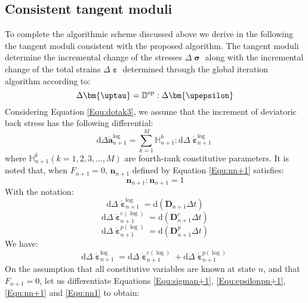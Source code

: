 \subsection{Consistent tangent moduli}
\noindent
To complete the algorithmic scheme discussed above we derive in the following the tangent moduli consistent with the proposed algorithm. The tangent moduli determine the incremental change of the stresses $\Delta {\bm{\upsigma }}$ along with the incremental change of the total strains $\Delta {\bm{\upepsilon }}$ determined through the global iteration algorithm according to:
\begin{equation}
\Delta {\bm{\uptau }} = {\mathbb{D}^{\rm{ep}}}:\Delta {\bm{\upepsilon }}
\end{equation}
Considering Equation \ref{Equ:dotak3}, we assume that the increment of deviatoric back stress has the following differential:
\begin{equation}
\label{Equ:dan+1}
{\text{d}}\Delta \mathring {\mathbf{a}}_{n + 1}^{\log } = \sum\limits_{k = 1}^M {\mathbb{H}_{n + 1}^k} :{\text{d}}\Delta \mathring {\bm{\upepsilon}}_{n + 1}^{\log }
\end{equation}
where $\mathbb{H}_{n + 1}^k( k = 1,2,3,...,M )$ are fourth-rank constitutive parameters.
It is noted that, when ${F_{n + 1}} = 0$, ${\mathbf{n}}_{n + 1}$ defined by Equation \ref{Equ:nn+1} satisfies:
\begin{equation}
\label{Equ:nn1}
{{\mathbf{n}}_{n + 1}}:{{\mathbf{n}}_{n + 1}} = 1
\end{equation}
With the notation:
\begin{equation}
{\text{d}}\Delta \mathring {\bm{\upepsilon}}_{n + 1}^{\log } = {\text{d}}(\mathbf{D}_{n+1} \Delta t)
\end{equation}
\begin{equation}
{\text{d}}\Delta \mathring {\bm{\upepsilon}}_{n + 1}^{e(\log) } = {\text{d}}(\mathbf{D}_{n+1}^e \Delta t)
\end{equation}
\begin{equation}
{\text{d}}\Delta \mathring {\bm{\upepsilon}}_{n + 1}^{p(\log) } = {\text{d}}(\mathbf{D}_{n+1}^p \Delta t)
\end{equation}
We have:
\begin{equation}
{\text{d}}\Delta \mathring {\bm{\upepsilon}}_{n + 1}^{\log } = {\text{d}}\Delta \mathring {\bm{\upepsilon}}_{n + 1}^{e(\log) } + {\text{d}}\Delta \mathring {\bm{\upepsilon}}_{n + 1}^{p(\log) }
\end{equation}
On the assumption that all constitutive variables are known at state $n$, and that $F_{n+1}=0$, let us differentiate Equations \ref{Equ:sigman+1}, \ref{Equ:epsilonpn+1}, \ref{Equ:nn+1} and \ref{Equ:nn1} to obtain:
